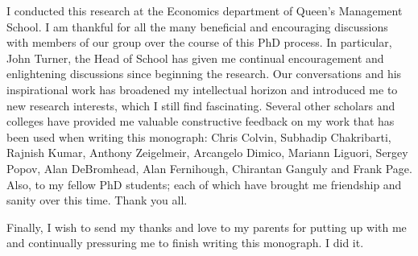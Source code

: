 \documentclass[11pt,fleqn]{book}
\begin{document}
I conducted this research at the Economics department of Queen's Management School. I am thankful for all the many beneficial and encouraging discussions with members of our group over the course of this PhD process. In particular, John Turner, the Head of School has given me continual encouragement and enlightening discussions since beginning the research. Our conversations and his inspirational work has broadened my intellectual horizon and introduced me to new research interests, which I still find fascinating. Several other scholars and colleges have provided me valuable constructive feedback on my work that has been used when writing this monograph: Chris Colvin, Subhadip Chakribarti, Rajnish Kumar, Anthony Zeigelmeir, Arcangelo Dimico, Mariann Liguori, Sergey Popov, Alan DeBromhead, Alan Fernihough, Chirantan Ganguly and Frank Page. Also, to my fellow PhD students; each of which have brought me friendship and sanity over this time. Thank you all.

Finally, I wish to send my thanks and love to my parents for putting up with me and continually pressuring me to finish writing this monograph. I did it.

\newpage
\mbox{}
\thispagestyle{empty}
\newpage

\setcounter{page}{1} 
\end{document}
